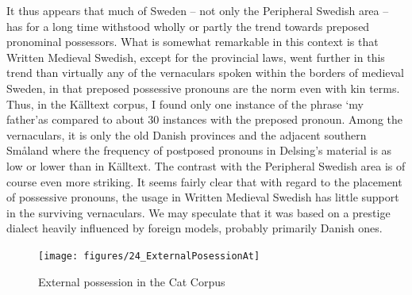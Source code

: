 It thus appears that much of Sweden – not only the Peripheral Swedish area – has for a long time withstood wholly or partly the trend towards preposed pronominal possessors. What is somewhat remarkable in this context is that Written Medieval Swedish, except for the provincial laws, went further in this trend than virtually any of the vernaculars spoken within the borders of medieval Sweden, in that preposed possessive pronouns are the norm even with kin terms. Thus, in the Källtext corpus, I found only one instance of the phrase ‘my father’\textstyleLinguisticExample{ }as compared to about 30 instances with the preposed pronoun. Among the vernaculars, it is only the old Danish provinces and the adjacent southern Småland where the frequency of postposed pronouns in Delsing’s material is as low or lower than in Källtext. The contrast with the Peripheral Swedish area is of course even more striking. It seems fairly clear that with regard to the placement of possessive pronouns, the usage in Written Medieval Swedish has little support in the surviving vernaculars. We may speculate that it was based on a prestige dialect heavily influenced by foreign models, probably primarily Danish ones.

 

\begin{figure}[h]

\texttt{[image: figures/24\_ExternalPosessionAt]}
\caption{External possession in the Cat Corpus}
\label{map:20}

\end{figure}

